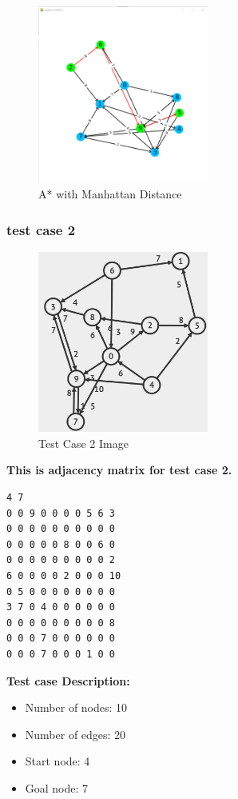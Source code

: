 \begin{figure}[h!]
    \centering
    \includegraphics[width=0.5\textwidth]{result/testcase1/astar_2.png}
    \caption{A* with Manhattan Distance}
\end{figure}
\clearpage

\subsubsection{test case 2}
\begin{figure}[h!]
    \centering
    \includegraphics[width=0.5\textwidth]{testcase/2.PNG}
    \caption{Test Case 2 Image}
\end{figure}
\textbf{This is adjacency matrix for test case 2.} 
\begin{verbatim}
4 7
0 0 9 0 0 0 0 5 6 3
0 0 0 0 0 0 0 0 0 0
0 0 0 0 0 8 0 0 6 0
0 0 0 0 0 0 0 0 0 2
6 0 0 0 0 2 0 0 0 10
0 5 0 0 0 0 0 0 0 0
3 7 0 4 0 0 0 0 0 0
0 0 0 0 0 0 0 0 0 8
0 0 0 7 0 0 0 0 0 0
0 0 0 7 0 0 0 1 0 0
\end{verbatim}
\textbf{Test case Description:} 
\begin{itemize}
    \item Number of nodes: 10
    \item Number of edges: 20
    \item Start node: 4
    \item Goal node: 7
\end{itemize}

